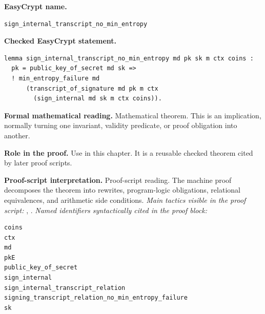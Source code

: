 \begin{formaltheorem}
\noindent\textbf{EasyCrypt name.}
\begin{lstlisting}[language=EasyCrypt,basicstyle=\ttfamily\scriptsize]
sign_internal_transcript_no_min_entropy
\end{lstlisting}
\noindent\textbf{Checked EasyCrypt statement.}
\begin{lstlisting}[language=EasyCrypt,basicstyle=\ttfamily\scriptsize]
lemma sign_internal_transcript_no_min_entropy md pk sk m ctx coins :
  pk = public_key_of_secret md sk =>
  ! min_entropy_failure md
      (transcript_of_signature md pk m ctx
        (sign_internal md sk m ctx coins)).
\end{lstlisting}
\noindent\textbf{Formal mathematical reading.}
Mathematical theorem. This is an implication, normally turning one invariant, validity predicate, or proof obligation into another.

\noindent\textbf{Role in the proof.}
Use in this chapter. It is a reusable checked theorem cited by later proof scripts.

\noindent\textbf{Proof-script interpretation.}
Proof-script reading. The machine proof decomposes the theorem into rewrites, program-logic obligations, relational equivalences, and arithmetic side conditions.
\emph{Main tactics visible in the proof script:} , .
\emph{Named identifiers syntactically cited in the proof block:}
\begin{lstlisting}[language=EasyCrypt,basicstyle=\ttfamily\scriptsize]
coins
ctx
md
pkE
public_key_of_secret
sign_internal
sign_internal_transcript_relation
signing_transcript_relation_no_min_entropy_failure
sk
\end{lstlisting}

\end{formaltheorem}

